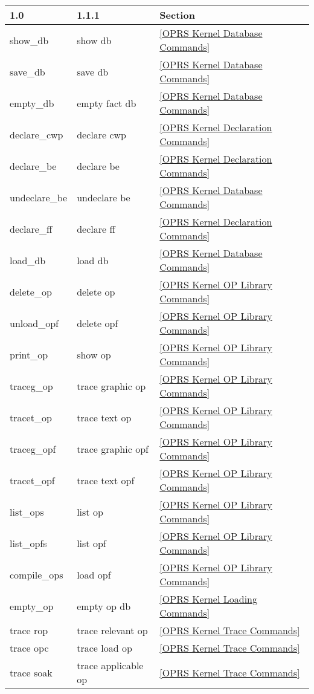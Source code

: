 \begin{table}
\begin{center}
\begin{tabular}{||l|l|l||}
\hline
1.0&1.1.1  & Section \\
\hline
 show\_db & show db & \ref{OPRS Kernel Database Commands} \\
 save\_db & save db & \ref{OPRS Kernel Database Commands} \\
 empty\_db & empty fact db & \ref{OPRS Kernel Database Commands} \\
 declare\_cwp & declare cwp & \ref{OPRS Kernel Declaration Commands} \\
 declare\_be & declare be & \ref{OPRS Kernel Declaration Commands} \\
 undeclare\_be & undeclare be & \ref{OPRS Kernel Database Commands} \\
 declare\_ff & declare ff & \ref{OPRS Kernel Declaration Commands} \\
 load\_db & load db & \ref{OPRS Kernel Database Commands} \\
 delete\_op & delete op & \ref{OPRS Kernel OP Library Commands} \\
 unload\_opf & delete opf & \ref{OPRS Kernel OP Library Commands} \\
 print\_op & show op & \ref{OPRS Kernel OP Library Commands} \\
 traceg\_op & trace graphic op & \ref{OPRS Kernel OP Library Commands} \\
 tracet\_op & trace text op & \ref{OPRS Kernel OP Library Commands} \\
 traceg\_opf & trace graphic opf & \ref{OPRS Kernel OP Library Commands} \\
 tracet\_opf & trace text opf & \ref{OPRS Kernel OP Library Commands} \\
 list\_ops & list op & \ref{OPRS Kernel OP Library Commands} \\
 list\_opfs & list opf & \ref{OPRS Kernel OP Library Commands} \\
 compile\_ops & load opf & \ref{OPRS Kernel OP Library Commands} \\
 empty\_op & empty op db & \ref{OPRS Kernel Loading Commands} \\
 trace rop & trace relevant op & \ref{OPRS Kernel Trace Commands} \\
 trace opc & trace load op & \ref{OPRS Kernel Trace Commands} \\
 trace soak & trace applicable op & \ref{OPRS Kernel Trace Commands} \\

\end{tabular}
\end{center}
\end{table}
